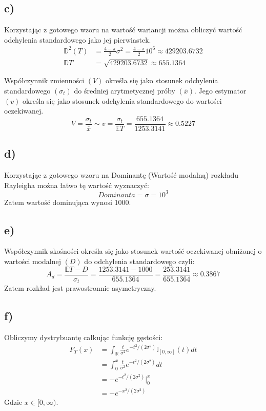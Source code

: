\documentclass{article}
\begin{document}
\subsection{c)}
Korzystając z gotowego wzoru na wartość wariancji można obliczyć wartość odchylenia standardowego jako jej pierwiastek.
\begin{align*}
\mathbb{D}^2(T) & = \frac{4 - \pi}{2} \sigma^2 = \frac{4 - \pi}{2} 10^6 \approx 429203.6732 \\
\mathbb{D}T & = \sqrt{429203.6732} \approx 655.1364
\end{align*}

Współczynnik zmienności $(V)$ określa się jako stosunek odchylenia standardowego $(\sigma_t)$ do średniej arytmetycznej próby $(\overline{x})$. Jego estymator $(v)$ określa się jako stosunek odchylenia standardowego do wartości oczekiwanej.
\[
V = \frac{\sigma_t}{\overline{x}} \sim v = \frac{\sigma_t}{\mathbb{E}T} = \frac{655.1364}{1253.3141} \approx 0.5227
\]

\subsection{d)}
Korzystając z gotowego wzoru na Dominantę (Wartość modalną) rozkładu Rayleigha można łatwo tę wartość wyznaczyć:
\[ Dominanta = \sigma = 10^3 \]
Zatem wartość dominująca wynosi 1000.

\subsection{e)}
Współczynnik skośności określa się jako stosunek wartość oczekiwanej obniżonej o wartości modalnej $(D)$ do odchylenia standardowego czyli:
\[ A_d = \frac{\mathbb{E}T - D}{\sigma_t} = \frac{1253.3141 - 1000}{655.1364} = \frac{253.3141}{655.1364} \approx 0.3867 \]
Zatem rozkład jest prawostronnie asymetryczny.

\subsection{f)}
Obliczymy dystrybuantę całkując funkcję gęstości:
\begin{align*}
F_T(x) & = \int_{\mathbb{R}} \frac{t}{\sigma^2} e^{-t^2 / (2\sigma^2)} \mathbb{I}_{[0,\infty]}(t) dt \\
& =  \int_0^x \frac{t}{\sigma^2} e^{-t^2 / (2\sigma^2)} dt \\
& = - e^{-t^2 / (2\sigma^2)} \Big\vert_0^x \\
& = - e^{-x^2 / (2\sigma^2)}
\end{align*}
Gdzie $x \in [0,\infty)$.
\end{document}
